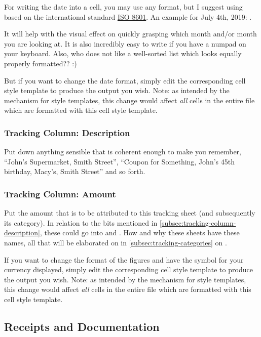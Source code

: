 For writing the date into a cell, you may use any format, but I suggest using  based on the international standard \href{https://en.wikipedia.org/wiki/ISO_8601}{ISO 8601}.
An example for July 4th, 2019: .

It will help with the visual effect on quickly grasping which month and/or month you are looking at.
It is also incredibly easy to write if you have a numpad on your keyboard.
Also, who does not like a well-sorted list which looks equally properly formatted?? :)

But if you want to change the date format, simply edit the corresponding cell style template to produce the output you wish.
Note: as intended by the mechanism for style templates, this change would affect \emph{all} cells in the entire file which are formatted with this cell style template.

\subsubsection{Tracking Column: Description}
\label{subsec:tracking-column-description}

Put down anything sensible that is coherent enough to make you remember, \eg ``John's Supermarket, Smith Street'', ``Coupon for Something, John's 45th birthday, Macy's, Smith Street'' and so forth.

\subsubsection{Tracking Column: Amount}
\label{subsec:tracking-column-amount}

Put the amount that is to be attributed to this tracking sheet (and subsequently its category).
In relation to the bits mentioned in \autoref{subsec:tracking-column-description}, these could go into  and .
How and why these sheets have these names, all that will be elaborated on in \autoref{subsec:tracking-categories} on .

If you want to change the format of the figures and have the symbol for your currency displayed, simply edit the corresponding cell style template to produce the output you wish.
Note: as intended by the mechanism for style templates, this change would affect \emph{all} cells in the entire file which are formatted with this cell style template.

\subsection{Receipts and Documentation}
\label{subsec:tracking-receipts}


